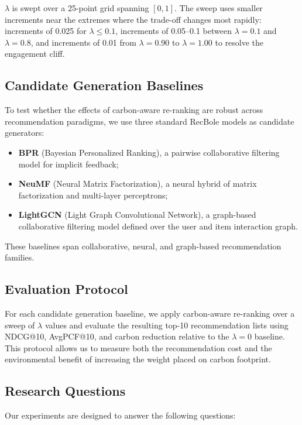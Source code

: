 \documentclass[11pt]{article}
\begin{document}
$\lambda$ is swept over a 25-point grid spanning $[0,1]$. The sweep uses smaller increments near the extremes
where the trade-off changes most rapidly: increments of 0.025 for $\lambda \leq 0.1$,
increments of 0.05--0.1 between $\lambda=0.1$ and $\lambda=0.8$, and increments of 0.01
from $\lambda=0.90$ to $\lambda=1.00$ to resolve the engagement cliff.

\subsection{Candidate Generation Baselines}

To test whether the effects of carbon-aware re-ranking are robust across recommendation
paradigms, we use three standard RecBole models as candidate generators:

\begin{itemize}
    \item \textbf{BPR} (Bayesian Personalized Ranking), a pairwise collaborative filtering model for implicit feedback;
    \item \textbf{NeuMF} (Neural Matrix Factorization), a neural hybrid of matrix factorization and multi-layer perceptrons;
    \item \textbf{LightGCN} (Light Graph Convolutional Network), a graph-based collaborative filtering model defined over the user and item interaction graph.
\end{itemize}

These baselines span collaborative, neural, and graph-based recommendation families.

\subsection{Evaluation Protocol}

For each candidate generation baseline, we apply carbon-aware re-ranking over a sweep of
$\lambda$ values and evaluate the resulting top-10 recommendation lists using NDCG@10,
AvgPCF@10, and carbon reduction relative to the $\lambda=0$ baseline. This
protocol allows us to measure both the recommendation cost and the environmental benefit of
increasing the weight placed on carbon footprint.

\subsection{Research Questions}

Our experiments are designed to answer the following questions:
\end{document}
